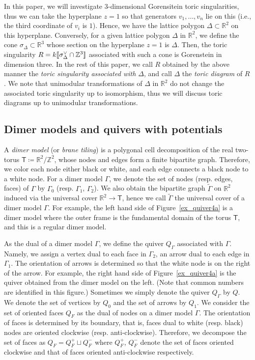 \documentclass[11pt]{amsart}
\theoremstyle{definition}
\newcommand{\ZZ}{\mathbb{Z}}
\newcommand{\RR}{\mathbb{R}}
\newcommand{\sfT}{\mathsf{T}}
\newcommand{\llbracket}{\mathopen{[\mkern -2.7mu[}}
\newcommand{\rrbracket}{\mathclose{]\mkern -2.7mu]}}
\begin{document}
In this paper, we will investigate $3$-dimensional Gorensitein toric singularities, thus we can take the hyperplane $z=1$ so that generators $v_1,\dots,v_n$ lie on this (i.e., the third coordinate of $v_i$ is $1$). Hence, we have the lattice polygon $\Delta\subset\RR^2$ on this hyperplane. Conversely, for a given lattice polygon $\Delta$ in $\RR^2$, we define the cone $\sigma_\Delta\subset\RR^3$ whose section on the hyperplane $z=1$ is $\Delta$. Then, the toric singularity $R=k\llbracket \sigma_\Delta^\vee\cap\ZZ^3\rrbracket $ associated with such a cone is Gorenstein in dimension three. In the rest of this paper, we call $R$ obtained by the above manner the \emph{toric singularity associated with $\Delta$}, and call $\Delta$ the \emph{toric diagram} of $R$. We note that unimodular transformations of $\Delta$ in $\RR^2$ do not change the associated toric singularity up to isomorphism, thus we will discuss toric diagrams up to unimodular transformations.



\subsection{Dimer models and quivers with potentials}\label{subsec_dimer}

A \emph{dimer model} (or \emph{brane tiling}) is a polygonal cell decomposition of the real two-torus $\sfT\coloneqq\RR^2/\ZZ^2$, whose nodes and edges form a finite bipartite graph. Therefore, we color each node either black or white, and each edge connects a black node to a white node. For a dimer model $\Gamma$, we denote the set of nodes (resp. edges, faces) of $\Gamma$ by $\Gamma_0$ (resp. $\Gamma_1$, $\Gamma_2$). We also obtain the bipartite graph $\widetilde{\Gamma}$ on $\RR^2$ induced via the universal cover $\RR^2\rightarrow\sfT$, hence we call $\widetilde{\Gamma}$ the universal cover of a dimer model $\Gamma$. For example, the left hand side of Figure~\ref{ex_quiver4a} is a dimer model where the outer frame is the fundamental domain of the torus $\sfT$, and this is a regular dimer model.

As the dual of a dimer model $\Gamma$, we define the quiver $Q_\Gamma$ associated with $\Gamma$. Namely, we assign a vertex dual to each face in $\Gamma_2$, an arrow dual to each edge in $\Gamma_1$. The orientation of arrows is determined so that the white node is on the right of the arrow. For example, the right hand side of Figure~\ref{ex_quiver4a} is the quiver obtained from the dimer model on the left. (Note that common numbers are identified in this figure.) Sometimes we simply denote the quiver $Q_\Gamma$ by $Q$. We denote the set of vertices by $Q_0$ and the set of arrows by $Q_1$. We consider the set of oriented faces $Q_F$ as the dual of nodes on a dimer model $\Gamma$. The orientation of faces is determined by its boundary, that is, faces dual to white (resp. black) nodes are oriented clockwise (resp. anti-clockwise). Therefore, we decompose the set of faces as $Q_F=Q^+_F\sqcup Q^-_F$ where $Q^+_F$, $Q^-_F$ denote the set of faces oriented clockwise and that of faces oriented anti-clockwise respectively.
\end{document}
